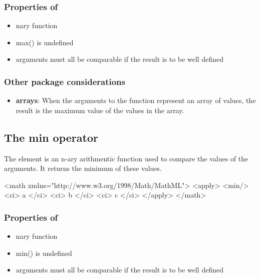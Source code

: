 \subsubsection{Properties of }

\begin{itemize}\setlength{\parskip}{-0.3ex}

\item nary function

\item max() is undefined

\item arguments must all be comparable if the result is to be well defined

\end{itemize}

\subsubsection{Other package considerations}

\begin{itemize}

\item \textbf{arrays}: When the arguments to the  function represent an array of values, the result is the maximum value of the values in the array.

 
\end{itemize}


\subsection{The min operator}
\label{sec_min}

The  element is an n-ary arithmentic function used to compare the values of the arguments. It returns the minimum of these values.

\begin{example}
<math xmlns="http://www.w3.org/1998/Math/MathML">
    <apply>
        <min/>
        <ci> a </ci>
        <ci> b </ci>
        <ci> c </ci>
    </apply>
</math>
\end{example}

\subsubsection{Properties of }

\begin{itemize}\setlength{\parskip}{-0.3ex}

\item nary function

\item min() is undefined

\item arguments must all be comparable if the result is to be well defined

\end{itemize}

